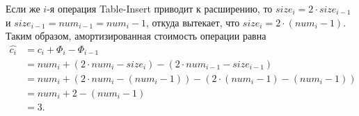 Если же $i$-я операция Table-Insert приводит к расширению, то $size_i = 2 \cdot size_{i - 1}$ и $size_{i - 1} = num_{i - 1} = num_i - 1$, откуда вытекает, что $size_i = 2 \cdot (num_i -1)$.
Таким образом, амортизированная стоимость операции равна
\begin{align*}
    \hat{c_i} &= c_i + \Phi_i - \Phi_{i - 1} \\
    &= num_i + (2 \cdot num_i - size_i) - (2 \cdot num_{i - 1} - size_{i - 1}) \\
    &= num_i + (2 \cdot num_i - (num_i - 1)) - (2 \cdot (num_i - 1) - (num_i - 1)) \\
    &= num_i + 2 - (num_i - 1) \\
    &= 3.
\end{align*}
